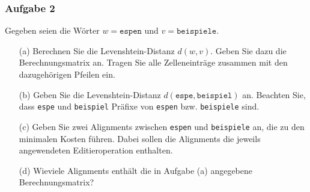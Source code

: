 \documentclass{beamer}
\begin{document}
\begin{frame} \frametitle{Aufgabe 2}
	Gegeben seien die Wörter $w = \texttt{espen}$ und $v = \texttt{beispiele}$.
	\begin{itemize}
		\item[(a)] Berechnen Sie die Levenshtein-Distanz $d(w,v)$. Geben Sie dazu die Berechnungsmatrix an. Tragen Sie alle Zelleneinträge zusammen mit den dazugehörigen Pfeilen ein.
		\item[(b)] Geben Sie die Levenshtein-Distanz $d(\texttt{espe},\texttt{beispiel})$ an. Beachten Sie, dass \texttt{espe} und \texttt{beispiel} Präfixe von \texttt{espen} bzw. \texttt{beispiele} sind.
		\item[(c)] Geben Sie zwei Alignments zwischen \texttt{espen} und \texttt{beispiele} an, die zu den minimalen Kosten führen. Dabei sollen die Alignments die jeweils angewendeten Editieroperation enthalten.
		\item[(d)] Wieviele Alignments enthält die in Aufgabe (a) angegebene Berechnungsmatrix?
	\end{itemize}
\end{frame}
\end{document}
